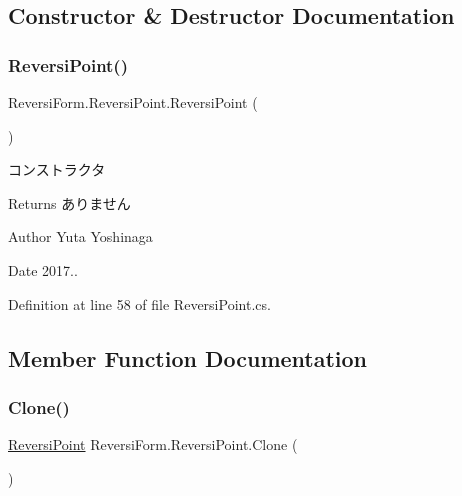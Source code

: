 \subsection{Constructor \& Destructor Documentation}
\mbox{\label{class_reversi_form_1_1_reversi_point_a19bc338ec65d6b967f741c1c73ad5b16}} 
\subsubsection{\texorpdfstring{Reversi\+Point()}{ReversiPoint()}}
{\footnotesize\ttfamily Reversi\+Form.\+Reversi\+Point.\+Reversi\+Point (\begin{DoxyParamCaption}{ }\end{DoxyParamCaption})}



コンストラクタ 

\begin{DoxyReturn}{Returns}
ありません 
\end{DoxyReturn}
\begin{DoxyAuthor}{Author}
Yuta Yoshinaga 
\end{DoxyAuthor}
\begin{DoxyDate}{Date}
2017.. 
\end{DoxyDate}


Definition at line 58 of file Reversi\+Point.\+cs.



\subsection{Member Function Documentation}
\mbox{\label{class_reversi_form_1_1_reversi_point_a0a237cffa3c12ec78bdf19c3baecfa69}} 
\subsubsection{\texorpdfstring{Clone()}{Clone()}}
{\footnotesize\ttfamily \hyperlink{class_reversi_form_1_1_reversi_point}{Reversi\+Point} Reversi\+Form.\+Reversi\+Point.\+Clone (\begin{DoxyParamCaption}{ }\end{DoxyParamCaption})}



